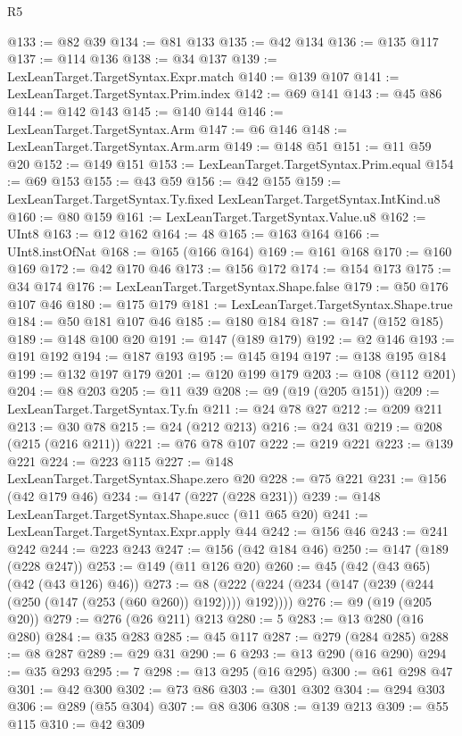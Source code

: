 \begin{lexlean}{R5}
\begin{coremodule}
{{{{{{{{{{{{{{{{{{{@133 := @82 @39
@134 := @81 @133
@135 := @42 @134
@136 := @135 @117
@137 := @114 @136
@138 := @34 @137
@139 := LexLeanTarget.TargetSyntax.Expr.match
@140 := @139 @107
@141 := LexLeanTarget.TargetSyntax.Prim.index
@142 := @69 @141
@143 := @45 @86
@144 := @142 @143
@145 := @140 @144
@146 := LexLeanTarget.TargetSyntax.Arm
@147 := @6 @146
@148 := LexLeanTarget.TargetSyntax.Arm.arm
@149 := @148 @51
@151 := @11 @59 @20
@152 := @149 @151
@153 := LexLeanTarget.TargetSyntax.Prim.equal
@154 := @69 @153
@155 := @43 @59
@156 := @42 @155
@159 := LexLeanTarget.TargetSyntax.Ty.fixed LexLeanTarget.TargetSyntax.IntKind.u8
@160 := @80 @159
@161 := LexLeanTarget.TargetSyntax.Value.u8
@162 := UInt8
@163 := @12 @162
@164 := 48
@165 := @163 @164
@166 := UInt8.instOfNat
@168 := @165 (@166 @164)
@169 := @161 @168
@170 := @160 @169
@172 := @42 @170 @46
@173 := @156 @172
@174 := @154 @173
@175 := @34 @174
@176 := LexLeanTarget.TargetSyntax.Shape.false
@179 := @50 @176 @107 @46
@180 := @175 @179
@181 := LexLeanTarget.TargetSyntax.Shape.true
@184 := @50 @181 @107 @46
@185 := @180 @184
@187 := @147 (@152 @185)
@189 := @148 @100 @20
@191 := @147 (@189 @179)
@192 := @2 @146
@193 := @191 @192
@194 := @187 @193
@195 := @145 @194
@197 := @138 @195 @184
@199 := @132 @197 @179
@201 := @120 @199 @179
@203 := @108 (@112 @201)
@204 := @8 @203
@205 := @11 @39
@208 := @9 (@19 (@205 @151))
@209 := LexLeanTarget.TargetSyntax.Ty.fn
@211 := @24 @78 @27
@212 := @209 @211
@213 := @30 @78
@215 := @24 (@212 @213)
@216 := @24 @31
@219 := @208 (@215 (@216 @211))
@221 := @76 @78 @107
@222 := @219 @221
@223 := @139 @221
@224 := @223 @115
@227 := @148 LexLeanTarget.TargetSyntax.Shape.zero @20
@228 := @75 @221
@231 := @156 (@42 @179 @46)
@234 := @147 (@227 (@228 @231))
@239 := @148 LexLeanTarget.TargetSyntax.Shape.succ (@11 @65 @20)
@241 := LexLeanTarget.TargetSyntax.Expr.apply @44
@242 := @156 @46
@243 := @241 @242
@244 := @223 @243
@247 := @156 (@42 @184 @46)
@250 := @147 (@189 (@228 @247))
@253 := @149 (@11 @126 @20)
@260 := @45 (@42 (@43 @65) (@42 (@43 @126) @46))
@273 := @8 (@222 (@224 (@234 (@147 (@239 (@244 (@250 (@147 (@253 (@60 @260)) @192)))) @192))))
@276 := @9 (@19 (@205 @20))
@279 := @276 (@26 @211) @213
@280 := 5
@283 := @13 @280 (@16 @280)
@284 := @35 @283
@285 := @45 @117
@287 := @279 (@284 @285)
@288 := @8 @287
@289 := @29 @31
@290 := 6
@293 := @13 @290 (@16 @290)
@294 := @35 @293
@295 := 7
@298 := @13 @295 (@16 @295)
@300 := @61 @298 @47
@301 := @42 @300
@302 := @73 @86
@303 := @301 @302
@304 := @294 @303
@306 := @289 (@55 @304)
@307 := @8 @306
@308 := @139 @213
@309 := @55 @115
@310 := @42 @309
}}}}}}}}}}}}}}}}}}}
\end{coremodule}
\end{lexlean}
